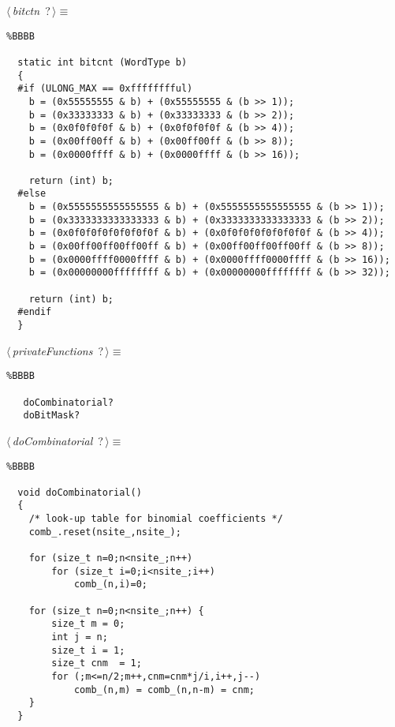 \documentclass{report}
\begin{document}
\begin{flushleft} \small
\begin{minipage}{\linewidth}\label{scrap12}\raggedright\small
{} $\langle\,${\it bitctn}\nobreak\ {\footnotesize {?}}$\,\rangle\equiv$
\begin{lstlisting}%BBBB
    
  static int bitcnt (WordType b)  
  {  
  #if (ULONG_MAX == 0xfffffffful)  
  	b = (0x55555555 & b) + (0x55555555 & (b >> 1));  
  	b = (0x33333333 & b) + (0x33333333 & (b >> 2));  
  	b = (0x0f0f0f0f & b) + (0x0f0f0f0f & (b >> 4));  
  	b = (0x00ff00ff & b) + (0x00ff00ff & (b >> 8));  
  	b = (0x0000ffff & b) + (0x0000ffff & (b >> 16));  
    
  	return (int) b;  
  #else  
  	b = (0x5555555555555555 & b) + (0x5555555555555555 & (b >> 1));  
  	b = (0x3333333333333333 & b) + (0x3333333333333333 & (b >> 2));  
  	b = (0x0f0f0f0f0f0f0f0f & b) + (0x0f0f0f0f0f0f0f0f & (b >> 4));  
  	b = (0x00ff00ff00ff00ff & b) + (0x00ff00ff00ff00ff & (b >> 8));  
  	b = (0x0000ffff0000ffff & b) + (0x0000ffff0000ffff & (b >> 16));  
  	b = (0x00000000ffffffff & b) + (0x00000000ffffffff & (b >> 32));  
    
  	return (int) b;  
  #endif  
  }  \end{lstlisting}
\end{minipage}\vspace{4ex}
\end{flushleft}
\begin{flushleft} \small
\begin{minipage}{\linewidth}\label{scrap13}\raggedright\small
{} $\langle\,${\it privateFunctions}\nobreak\ {\footnotesize {?}}$\,\rangle\equiv$
\begin{lstlisting}%BBBB
    
   doCombinatorial?  
   doBitMask?  
   \end{lstlisting}
\end{minipage}\vspace{4ex}
\end{flushleft}
\begin{flushleft} \small
\begin{minipage}{\linewidth}\label{scrap14}\raggedright\small
{} $\langle\,${\it doCombinatorial}\nobreak\ {\footnotesize {?}}$\,\rangle\equiv$
\begin{lstlisting}%BBBB
    
  void doCombinatorial()  
  {  
  	/* look-up table for binomial coefficients */  
  	comb_.reset(nsite_,nsite_);  
    
  	for (size_t n=0;n<nsite_;n++)  
  		for (size_t i=0;i<nsite_;i++)  
  			comb_(n,i)=0;  
    
  	for (size_t n=0;n<nsite_;n++) {  
  		size_t m = 0;  
  		int j = n;  
  		size_t i = 1;  
  		size_t cnm  = 1;  
  		for (;m<=n/2;m++,cnm=cnm*j/i,i++,j--)  
  			comb_(n,m) = comb_(n,n-m) = cnm;  
  	}  
  }  \end{lstlisting}
\end{minipage}\vspace{4ex}
\end{flushleft}
\end{document}
